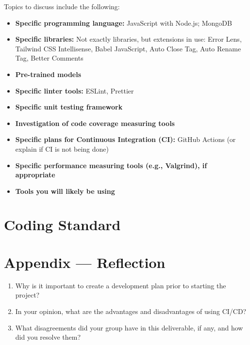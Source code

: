 \documentclass{article}
\begin{document}
Topics to discuss include the following:

\begin{itemize}
  \item \textbf{Specific programming language:} JavaScript with Node.js; MongoDB
  \item \textbf{Specific libraries:}  
        Not exactly libraries, but extensions in use: Error Lens, Tailwind CSS Intellisense, Babel JavaScript, Auto Close Tag, Auto Rename Tag, Better Comments
  \item \textbf{Pre-trained models}
  \item \textbf{Specific linter tools:} ESLint, Prettier
  \item \textbf{Specific unit testing framework}
  \item \textbf{Investigation of code coverage measuring tools}
  \item \textbf{Specific plans for Continuous Integration (CI):}  
        GitHub Actions (or explain if CI is not being done)
  \item \textbf{Specific performance measuring tools (e.g., Valgrind), if appropriate}
  \item \textbf{Tools you will likely be using}
\end{itemize}



\section{Coding Standard}


\newpage{}

\section*{Appendix --- Reflection}




\begin{enumerate}
    \item Why is it important to create a development plan prior to starting the
    project?
    \item In your opinion, what are the advantages and disadvantages of using
    CI/CD?
    \item What disagreements did your group have in this deliverable, if any,
    and how did you resolve them?
\end{enumerate}
\end{document}
